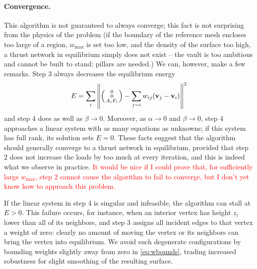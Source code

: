 \documentclass[annual]{acmsiggraph}
\makeatletter
\def\Forcevector{\Big(\mbox{\scriptsize
	\def\arraystretch{0.8}\begin{tabular}{@{\,}c@{\,}}
	0 \\ 0 \\ $A_i F_i$
	\end{tabular}}\Big)}
\newcommand{\todo}[1]{\textcolor{red}{#1}}
\makeatother
\begin{document}
\paragraph{Convergence.}
This algorithm is not guaranteed to always converge; this fact is not surprising from the physics of the problem (if the boundary of the reference mesh encloses too large of a region, $w_{\max}$ is set too low, and the density of the surface too high, a thrust network in equilibrium simply does not exist -- the vault is too ambitious and cannot be built to stand; pillars are needed.) We can, however, make a few remarks. Step 3 always decreases the equilibrium energy
$$E=\sum_i \left\| \Forcevector - \sum_{j\sim i} w_{ij} (\vw_j - \vw_i)\right\|^2$$
and step 4 does as well as $\beta \to 0$. Moreover, as $\alpha \to 0$ and $\beta \to 0$, step 4 approaches a linear system with as many equations as unknowns; if this system has full rank, its solution sets $E=0$. These facts suggest that the algorithm should generally converge to a thrust network in equilibrium, provided that step 2 does not increase the loads by too much at every iteration, and this is indeed what we observe in practice.  \todo{It would be nice if I could prove that, for sufficiently large $w_{\textrm{max}}$, step 2 cannot cause the algorithm to fail to converge, but I don't yet know how to approach this problem.}

If the linear system in step 4 is singular and infeasible, the algorithm can stall at $E > 0$. This failure occurs, for instance, when an interior vertex has height $z_i$ lower than all of its neighbors, and step 3 assigns all incident edges to that vertex a weight of zero: clearly no amount of moving the vertex or its neighbors can bring the vertex into equilibrium. We avoid such degenerate configurations by bounding weights slightly away from zero in \eqref{eq:wbounds}, trading increased robustness for slight smoothing of the resulting surface.
\end{document}
